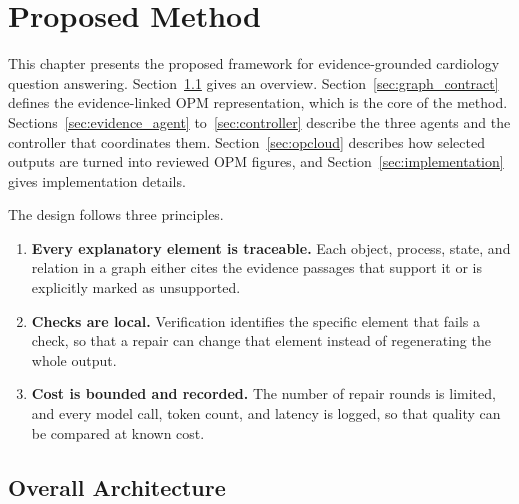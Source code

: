 \chapter{Proposed Method}
\label{chap:method}



This chapter presents the proposed framework for evidence-grounded cardiology question answering. Section~\ref{sec:architecture} gives an overview. Section~\ref{sec:graph_contract} defines the evidence-linked OPM representation, which is the core of the method. Sections~\ref{sec:evidence_agent} to~\ref{sec:controller} describe the three agents and the controller that coordinates them. Section~\ref{sec:opcloud} describes how selected outputs are turned into reviewed OPM figures, and Section~\ref{sec:implementation} gives implementation details.

The design follows three principles.
\begin{enumerate}[label=(\roman*)]
  \item \textbf{Every explanatory element is traceable.} Each object, process, state, and relation in a graph either cites the evidence passages that support it or is explicitly marked as unsupported.
  \item \textbf{Checks are local.} Verification identifies the specific element that fails a check, so that a repair can change that element instead of regenerating the whole output.
  \item \textbf{Cost is bounded and recorded.} The number of repair rounds is limited, and every model call, token count, and latency is logged, so that quality can be compared at known cost.
\end{enumerate}

\section{Overall Architecture}
\label{sec:architecture}


